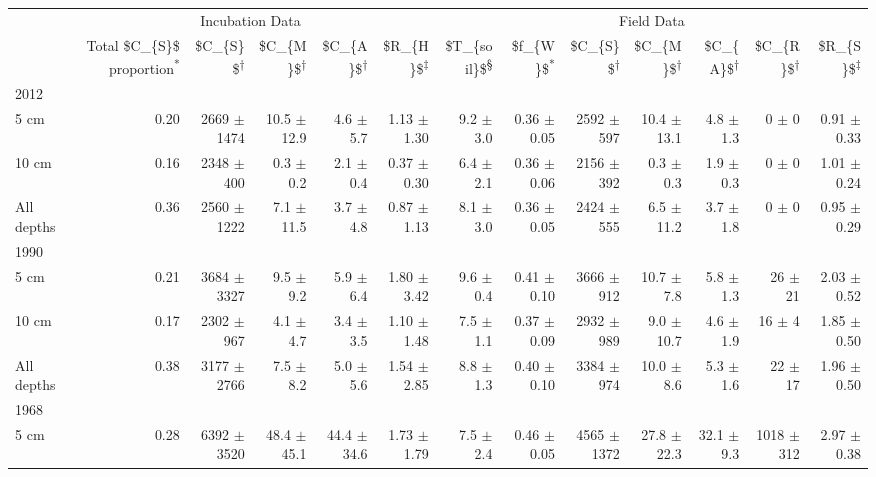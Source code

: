 \captionsetup[table]{labelformat=empty,skip=1pt}
\begin{longtable}{lrrrrrrrrrrrr}
\toprule
 & \multicolumn{5}{c}{Incubation Data} & \multicolumn{7}{c}{Field Data} \\ 
 \cmidrule(lr){2-6} \cmidrule(lr){7-13}
 & Total \$C\_\{S\}\$ proportion\textsuperscript{*} & \$C\_\{S\}\$\textsuperscript{†} & \$C\_\{M\}\$\textsuperscript{†} & \$C\_\{A\}\$\textsuperscript{†} & \$R\_\{H\}\$\textsuperscript{‡} & \$T\_\{soil\}\$\textsuperscript{§} & \$f\_\{W\}\$\textsuperscript{*} & \$C\_\{S\}\$\textsuperscript{†} & \$C\_\{M\}\$\textsuperscript{†} & \$C\_\{A\}\$\textsuperscript{†} & \$C\_\{R\}\$\textsuperscript{†} & \$R\_\{S\}\$\textsuperscript{‡} \\ 
\midrule
\multicolumn{1}{l}{2012} \\ 
\midrule
5 cm & 0.20 & 2669 $\pm$ 1474 & 10.5 $\pm$ 12.9 & 4.6 $\pm$ 5.7 & 1.13 $\pm$ 1.30 & 9.2 $\pm$ 3.0 & 0.36 $\pm$ 0.05 & 2592 $\pm$ 597 & 10.4 $\pm$ 13.1 & 4.8 $\pm$ 1.3 & 0 $\pm$ 0 & 0.91 $\pm$ 0.33 \\ 
10 cm & 0.16 & 2348 $\pm$ 400 & 0.3 $\pm$ 0.2 & 2.1 $\pm$ 0.4 & 0.37 $\pm$ 0.30 & 6.4 $\pm$ 2.1 & 0.36 $\pm$ 0.06 & 2156 $\pm$ 392 & 0.3 $\pm$ 0.3 & 1.9 $\pm$ 0.3 & 0 $\pm$ 0 & 1.01 $\pm$ 0.24 \\ 
All depths & 0.36 & 2560 $\pm$ 1222 & 7.1 $\pm$ 11.5 & 3.7 $\pm$ 4.8 & 0.87 $\pm$ 1.13 & 8.1 $\pm$ 3.0 & 0.36 $\pm$ 0.05 & 2424 $\pm$ 555 & 6.5 $\pm$ 11.2 & 3.7 $\pm$ 1.8 & 0 $\pm$ 0 & 0.95 $\pm$ 0.29 \\ 
\midrule
\multicolumn{1}{l}{1990} \\ 
\midrule
5 cm & 0.21 & 3684 $\pm$ 3327 & 9.5 $\pm$ 9.2 & 5.9 $\pm$ 6.4 & 1.80 $\pm$ 3.42 & 9.6 $\pm$ 0.4 & 0.41 $\pm$ 0.10 & 3666 $\pm$ 912 & 10.7 $\pm$ 7.8 & 5.8 $\pm$ 1.3 & 26 $\pm$ 21 & 2.03 $\pm$ 0.52 \\ 
10 cm & 0.17 & 2302 $\pm$ 967 & 4.1 $\pm$ 4.7 & 3.4 $\pm$ 3.5 & 1.10 $\pm$ 1.48 & 7.5 $\pm$ 1.1 & 0.37 $\pm$ 0.09 & 2932 $\pm$ 989 & 9.0 $\pm$ 10.7 & 4.6 $\pm$ 1.9 & 16 $\pm$ 4 & 1.85 $\pm$ 0.50 \\ 
All depths & 0.38 & 3177 $\pm$ 2766 & 7.5 $\pm$ 8.2 & 5.0 $\pm$ 5.6 & 1.54 $\pm$ 2.85 & 8.8 $\pm$ 1.3 & 0.40 $\pm$ 0.10 & 3384 $\pm$ 974 & 10.0 $\pm$ 8.6 & 5.3 $\pm$ 1.6 & 22 $\pm$ 17 & 1.96 $\pm$ 0.50 \\ 
\midrule
\multicolumn{1}{l}{1968} \\ 
\midrule
5 cm & 0.28 & 6392 $\pm$ 3520 & 48.4 $\pm$ 45.1 & 44.4 $\pm$ 34.6 & 1.73 $\pm$ 1.79 & 7.5 $\pm$ 2.4 & 0.46 $\pm$ 0.05 & 4565 $\pm$ 1372 & 27.8 $\pm$ 22.3 & 32.1 $\pm$ 9.3 & 1018 $\pm$ 312 & 2.97 $\pm$ 0.38 \\ 

\end{longtable}
